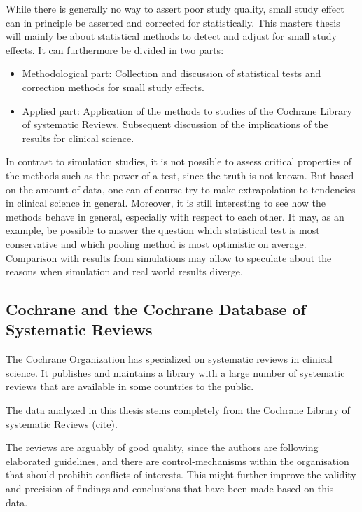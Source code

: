 \documentclass[11pt,a4paper,twoside]{book}\usepackage[]{graphicx}\usepackage[]{color}
\begin{document}
\vspace{0mm}
While there is generally no way to assert poor study quality, small study effect can in principle be asserted and corrected for statistically. This masters thesis will mainly be about statistical methods to detect and adjust for small study effects. It can furthermore be divided in two parts:
\begin{itemize}
\item Methodological part: Collection and discussion of statistical tests and correction methods for small study effects.
\item Applied part: Application of the methods to studies of the Cochrane Library of systematic Reviews. Subsequent discussion of the implications
of the results for clinical science.
\end{itemize}

In contrast to simulation studies, it is not possible to assess critical properties of the methods such as the power of a test, since the truth is not known. But based on the amount of data, one can of course try to make extrapolation to tendencies in clinical science in general. Moreover, it is still interesting to see how the methods behave in general, especially with respect to each other. It may, as an example, be possible to answer the question which statistical test is most conservative and which pooling method is most optimistic on average. Comparison with results from simulations may allow to speculate about the reasons when simulation and real world results diverge.


\subsection{Cochrane and the Cochrane Database of Systematic Reviews}
The Cochrane Organization has specialized on systematic reviews in clinical science. It publishes and maintains a library with a large number of systematic reviews that are available in some countries to the public.

\vspace{0mm}
The data analyzed in this thesis stems completely from the Cochrane Library of systematic Reviews (cite). 

\vspace{0mm}
The reviews are arguably of good quality, since the authors are following elaborated guidelines, and there are control-mechanisms within the organisation that should prohibit conflicts of interests. This might further improve the validity and precision of findings and conclusions that have been made based on this data. 
\end{document}
